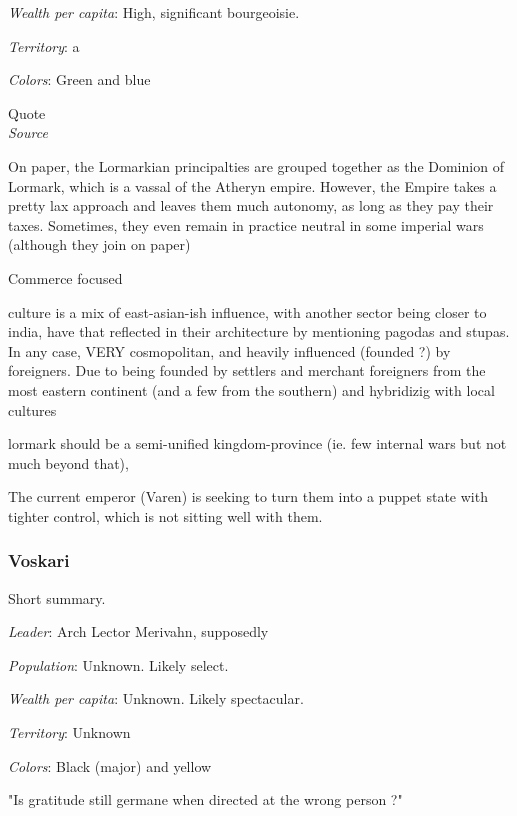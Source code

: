 \textit{Wealth per capita}: High, significant bourgeoisie.

\textit{Territory}: a
    
\textit{Colors}: Green and blue


\begin{rpg-quotebox}
Quote \\ \textendash \textit{Source}
\end{rpg-quotebox}

On paper, the Lormarkian principalties are grouped together as the Dominion of Lormark, which is a vassal of the Atheryn empire. However, the Empire takes a pretty lax approach and leaves them much autonomy, as long as they pay their taxes. Sometimes, they even remain in practice neutral in some imperial wars (although they join on paper)

Commerce focused

culture is a mix of east-asian-ish influence, with another sector being closer to india, have that reflected in their architecture by mentioning pagodas and stupas. In any case, VERY cosmopolitan, and heavily influenced (founded ?) by foreigners. Due to being founded by settlers and merchant foreigners from the most eastern continent (and a few from the southern) and hybridizig with local cultures

lormark should be a semi-unified kingdom-province (ie. few internal wars but not much beyond that), 

The current emperor (Varen) is seeking to turn them into a puppet state with tighter control, which is not sitting well with them.

	

\subsubsection{Voskari}

Short summary.


\textit{Leader}: Arch Lector Merivahn, supposedly

\textit{Population}: Unknown. Likely select.

\textit{Wealth per capita}: Unknown. Likely spectacular.

\textit{Territory}: Unknown
    
\textit{Colors}: Black (major) and yellow






\begin{rpg-quotebox}
	"Is gratitude still germane when directed at the wrong person ?"
\end{rpg-quotebox}

